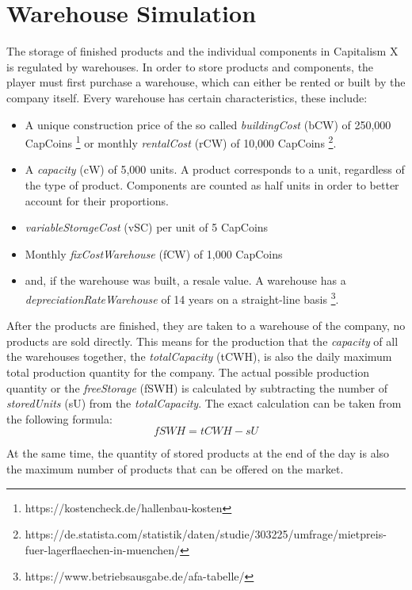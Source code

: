 \section{Warehouse Simulation} \label{warehouse_simulation}

The storage of finished products and the individual components in Capitalism X is regulated by warehouses. In order to store products and components, the player must first purchase a warehouse, which can either be rented or built by the company itself. Every warehouse has certain characteristics, these include:
\begin{itemize}
    \item A unique construction price of the so called \textit{buildingCost} (\gls{bCW}) of 250,000 CapCoins  \footnote{https://kostencheck.de/hallenbau-kosten} or monthly \textit{rentalCost} (\gls{rCW}) of 10,000 CapCoins \footnote{https://de.statista.com/statistik/daten/studie/303225/umfrage/mietpreis-fuer-lagerflaechen-in-muenchen/}.
    \item A \textit{capacity} (\gls{cW}) of 5,000 units. A product corresponds to a unit, regardless of the type of product. Components are counted as half units in order to better account for their proportions. 
    \item \textit{variableStorageCost} (\gls{vSC}) per unit of 5 CapCoins
    \item Monthly \textit{fixCostWarehouse} (\gls{fCW}) of 1,000 CapCoins
    \item and, if the warehouse was built, a resale value. A warehouse has a \textit{depreciationRateWarehouse} of 14 years on a straight-line basis \footnote{https://www.betriebsausgabe.de/afa-tabelle/}.
\end{itemize}

After the products are finished, they are taken to a warehouse of the company, no products are sold directly. This means for the production that the \textit{capacity} of all the warehouses together, the \textit{totalCapacity} (\gls{tCWH}), is also the daily maximum total production quantity for the company. The actual possible production quantity or the \textit{freeStorage} (\gls{fSWH}) is calculated by subtracting the number of \textit{storedUnits} (\gls{sU}) from the \textit{totalCapacity}. The exact calculation can be taken from the following formula: 
\begin{equation}
    fSWH = tCWH - sU
\end{equation}

At the same time, the quantity of stored products at the end of the day is also the maximum number of products that can be offered on the market. 

